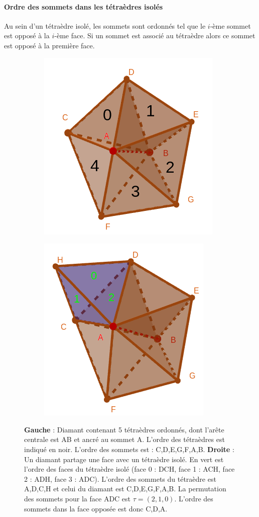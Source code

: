 \paragraph{Ordre des sommets dans les tétraèdres isolés}
Au sein d'un tétraèdre isolé, les sommets sont ordonnés tel que le $i$-ème sommet est opposé à la $i$-ème face. Si un sommet est associé au tétraèdre alors ce sommet est opposé à la première face.
\begin{figure}[H]
\centering
\begin{subfigure}{.5\textwidth}
  \centering
  \includegraphics[scale=0.34]{../Images/tetra_ordonnee}
  \caption{}
  \label{fig:tetra_ordonnee}
\end{subfigure}%
\begin{subfigure}{.5\textwidth}
  \centering
  \includegraphics[scale=0.34]{../Images/permutation_tetra_diamant}
  \caption{}
  \label{fig:permutation_tetra_diamant}
\end{subfigure}
\caption{\textbf{Gauche} : Diamant contenant 5 tétraèdres ordonnés, dont l'arête centrale est AB et ancré au sommet A. L'ordre des tétraèdres est indiqué en noir. L'ordre des sommets est : C,D,E,G,F,A,B. \textbf{Droite} : Un diamant partage une face avec un tétraèdre isolé. En vert est l'ordre des faces du tétraèdre isolé (face 0 : DCH, face 1 : ACH, face 2 : ADH, face 3 : ADC). L'ordre des sommets du tétraèdre est A,D,C,H et celui du diamant est C,D,E,G,F,A,B. La permutation des sommets pour la face ADC est $\tau=(2,1,0)$. L'ordre des sommets dans la face opposée est donc C,D,A.}
\end{figure}
